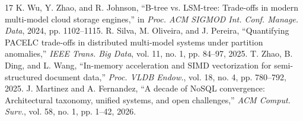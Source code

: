 \documentclass[conference,a4paper]{IEEEtran}
\begin{document}
\begin{thebibliography}{17}
 K. Wu, Y. Zhao, and R. Johnson, ``B-tree vs. LSM-tree: Trade-offs in modern multi-model cloud storage engines,'' in \textit{Proc. ACM SIGMOD Int. Conf. Manage. Data}, 2024, pp. 1102--1115. %
 R. Silva, M. Oliveira, and J. Pereira, ``Quantifying PACELC trade-offs in distributed multi-model systems under partition anomalies,'' \textit{IEEE Trans. Big Data}, vol. 11, no. 1, pp. 84--97, 2025. %
 T. Zhao, B. Ding, and L. Wang, ``In-memory acceleration and SIMD vectorization for semi-structured document data,'' \textit{Proc. VLDB Endow.}, vol. 18, no. 4, pp. 780--792, 2025. %
 J. Martinez and A. Fernandez, ``A decade of NoSQL convergence: Architectural taxonomy, unified systems, and open challenges,'' \textit{ACM Comput. Surv.}, vol. 58, no. 1, pp. 1--42, 2026. %
\end{thebibliography}
\end{document}
